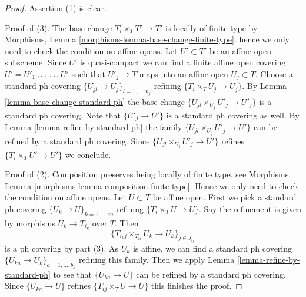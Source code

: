 \documentclass[10pt,a4paper]{amsart}
\theoremstyle{plain}
\theoremstyle{definition}
\theoremstyle{remark}
\numberwithin{equation}{subsection}
\begin{document}
\begin{proof}
Assertion (1) is clear.

\medskip\noindent
Proof of (3). The base change $T_i \times_T T' \to T'$ is
locally of finite type by
Morphisms, Lemma \ref{morphisms-lemma-base-change-finite-type}.
hence we only need to check the condition on affine opens.
Let $U' \subset T'$ be an affine open subscheme.
Since $U'$ is quasi-compact we can find a finite affine open
covering $U' = U'_1 \cup \ldots \cup U'$ such that
$U'_j \to T$ maps into an affine open $U_j \subset T$.
Choose a standard ph covering $\{U_{jl} \to U_j\}_{l = 1, \ldots, n_j}$
refining $\{T_i \times_T U_j \to U_j\}$.
By Lemma \ref{lemma-base-change-standard-ph}
the base change $\{U_{jl} \times_{U_j} U'_j \to U'_j\}$
is a standard ph covering. Note that $\{U'_j \to U'\}$
is a standard ph covering as well.
By Lemma \ref{lemma-refine-by-standard-ph} 
the family $\{U_{jl} \times_{U_j} U'_j \to U'\}$
can be refined by a standard ph covering. Since
$\{U_{jl} \times_{U_j} U'_j \to U'\}$ refines $\{T_i \times_T U' \to U'\}$
we conclude.

\medskip\noindent
Proof of (2). Composition preserves being locally of finite type,
see Morphisms, Lemma \ref{morphisms-lemma-composition-finite-type}.
Hence we only need to check the condition on affine opens.
Let $U \subset T$ be affine open. First we pick a standard ph covering
$\{U_k \to U\}_{k = 1, \ldots, m}$ refining
$\{T_i \times_T U \to U\}$.
Say the refinement is given by morphisms $U_k \to T_{i_k}$ over $T$.
Then
$$
\{T_{i_kj} \times_{T_{i_k}} U_k \to U_k\}_{j \in J_{i_k}}
$$
is a ph covering by part (3). As $U_k$ is affine,
we can find a standard ph covering
$\{U_{ka} \to U_k\}_{a = 1, \ldots, b_k}$ refining this family.
Then we apply Lemma \ref{lemma-refine-by-standard-ph}
to see that $\{U_{ka} \to U\}$ can be refined by a
standard ph covering. Since $\{U_{ka} \to U\}$
refines $\{T_{ij} \times_T U \to U\}$ this finishes the proof.
\end{proof}
\end{document}
